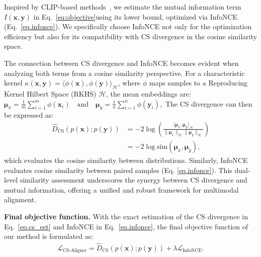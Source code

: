 Inspired by CLIP-based methods~\citep{radford2021learning}, we estimate the mutual information term $I(\mathbf{x}, \mathbf{y})$ in Eq.~\eqref{eq:objective}using its lower bound, optimized via InfoNCE (Eq.~\eqref{eq.infonce}). 
We specifically choose InfoNCE not only for the optimization efficiency but also for its compatibility with CS divergence in the cosine similarity space.
 
 

\begin{remark}
\label{remark:cs-mi-connection}
The connection between CS divergence and InfoNCE becomes evident when analyzing both terms from a cosine similarity perspective. For a characteristic kernel \(\kappa(\mathbf{x}, \mathbf{y}) = \langle \phi(\mathbf{x}), \phi(\mathbf{y}) \rangle_{\mathcal{H}}\), where \(\phi\) maps samples to a Reproducing Kernel Hilbert Space (RKHS) \(\mathcal{H}\), the mean embeddings are:  
$
	\boldsymbol{\mu}_x = \frac{1}{m} \sum_{i=1}^m \phi(\mathbf{x}_i) 
	\quad \text{and} \quad 
	\boldsymbol{\mu}_y = \frac{1}{n} \sum_{i=1}^n \phi(\mathbf{y}_i),
$
The CS divergence can then be expressed as:   
\begin{equation}
	\begin{aligned}
		\label{eq.cos_cs}
		\hat{D}_{\mathrm{CS}}(p(\mathbf{x}); p(\mathbf{y})) &= -2 \log \left( \frac{\langle \boldsymbol{\mu}_x, \boldsymbol{\mu}_y \rangle_{\mathcal{H}}}{\|\boldsymbol{\mu}_x\|_{\mathcal{H}} \|\boldsymbol{\mu}_y\|_{\mathcal{H}}} \right) \\
		&= -2 \log \text{sim}(\boldsymbol{\mu}_x, \boldsymbol{\mu}_y),
	\end{aligned}
\end{equation}  
which evaluates the cosine similarity between distributions. Similarly, InfoNCE evaluates cosine similarity between paired samples (Eq. \ref{eq.infonce}). This dual-level similarity assessment underscores the synergy between CS divergence and mutual information, offering a unified and robust framework for multimodal alignment.  
\end{remark}
 



\noindent
\textbf{Final objective function.} 
With the exact estimation of the CS divergence in Eq.~\eqref{eq.cs_est} and InfoNCE in Eq.~\eqref{eq.infonce}, the final objective function of our method is formulated as:
\begin{equation}
\begin{aligned}
\mathcal{L}_\text{CS-Aligner} = \widehat{D}_{\text{CS}} (p(\mathbf{x});p(\mathbf{y})) + \lambda \mathcal{L}_\text{InfoNCE}.
\end{aligned}
\label{eq:finalobjective}
\end{equation}

